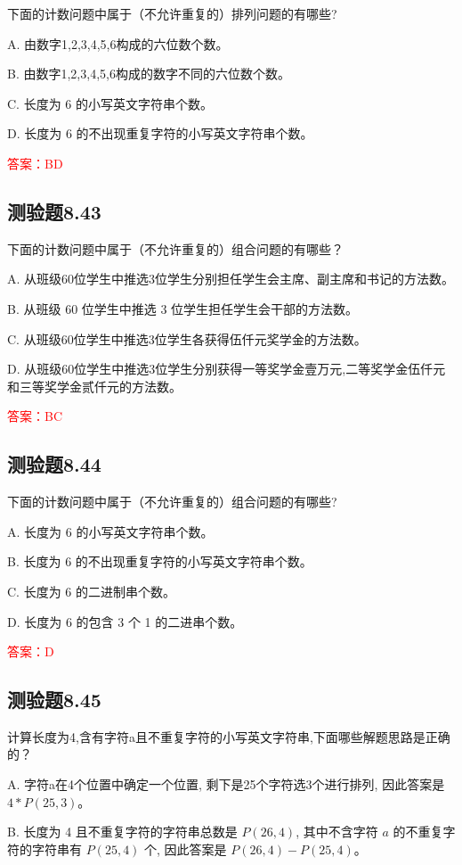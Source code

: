 \documentclass[UTF8, heading=true]{ctexart}
\begin{document}
下面的计数问题中属于（不允许重复的）排列问题的有哪些?

A. 由数字1,2,3,4,5,6构成的六位数个数。

B. 由数字1,2,3,4,5,6构成的数字不同的六位数个数。

C. 长度为 6 的小写英文字符串个数。

D. 长度为 6 的不出现重复字符的小写英文字符串个数。

\textcolor{red}{答案：BD}

\subsection{测验题8.43}

下面的计数问题中属于（不允许重复的）组合问题的有哪些？

A. 从班级60位学生中推选3位学生分别担任学生会主席、副主席和书记的方法数。

B. 从班级 60 位学生中推选 3 位学生担任学生会干部的方法数。

C. 从班级60位学生中推选3位学生各获得伍仟元奖学金的方法数。

D. 从班级60位学生中推选3位学生分别获得一等奖学金壹万元,二等奖学金伍仟元和三等奖学金贰仟元的方法数。

\textcolor{red}{答案：BC}

\subsection{测验题8.44}

下面的计数问题中属于（不允许重复的）组合问题的有哪些?

A. 长度为 6 的小写英文字符串个数。

B. 长度为 6 的不出现重复字符的小写英文字符串个数。

C. 长度为 6 的二进制串个数。

D. 长度为 6 的包含 3 个 1 的二进串个数。

\textcolor{red}{答案：D}

\subsection{测验题8.45}

计算长度为4,含有字符a且不重复字符的小写英文字符串,下面哪些解题思路是正确的？

A. 字符a在4个位置中确定一个位置, 剩下是25个字符选3个进行排列, 因此答案是$4*P(25, 3)$。

B. 长度为 4 且不重复字符的字符串总数是 $P(26,4)$, 其中不含字符 $a$ 的不重复字符的字符串有 $P(25,4)$ 个, 因此答案是 $P(26, 4)-P(25,4)$。
\end{document}
